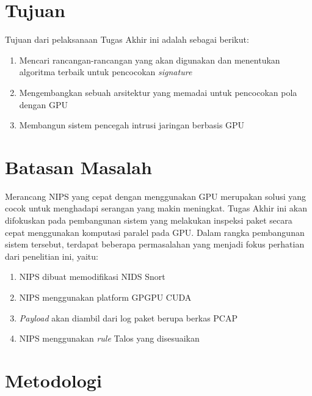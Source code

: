 \section{Tujuan}

  Tujuan dari pelaksanaan Tugas Akhir ini adalah sebagai berikut:
  \begin{enumerate}
      \item Mencari rancangan-rancangan yang akan digunakan dan menentukan algoritma terbaik untuk pencocokan \emph{signature}
      \item Mengembangkan sebuah arsitektur yang memadai untuk pencocokan pola dengan GPU
      \item Membangun sistem pencegah intrusi jaringan berbasis GPU
  \end{enumerate}

\section{Batasan Masalah}

  Merancang NIPS yang cepat dengan menggunakan GPU merupakan solusi yang cocok untuk menghadapi serangan yang makin meningkat. Tugas Akhir ini akan difokuskan pada pembangunan sistem yang melakukan inspeksi paket secara cepat menggunakan komputasi paralel pada GPU. Dalam rangka pembangunan sistem tersebut, terdapat beberapa permasalahan yang menjadi fokus perhatian dari penelitian ini, yaitu:
  \begin{enumerate}
      \item NIPS dibuat memodifikasi NIDS Snort
      \item NIPS menggunakan platform GPGPU CUDA
      \item \emph{Payload} akan diambil dari log paket berupa berkas PCAP
      \item NIPS menggunakan \emph{rule} Talos yang disesuaikan
  \end{enumerate}

\section{Metodologi}

